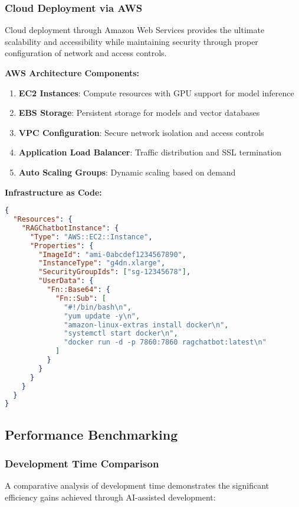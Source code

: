 \subsubsection{Cloud Deployment via AWS}

Cloud deployment through Amazon Web Services provides the ultimate scalability and accessibility while maintaining security through proper configuration of network and access controls.

\textbf{AWS Architecture Components:}
\begin{enumerate}
    \item \textbf{EC2 Instances}: Compute resources with GPU support for model inference
    \item \textbf{EBS Storage}: Persistent storage for models and vector databases
    \item \textbf{VPC Configuration}: Secure network isolation and access controls
    \item \textbf{Application Load Balancer}: Traffic distribution and SSL termination
    \item \textbf{Auto Scaling Groups}: Dynamic scaling based on demand
\end{enumerate}

\textbf{Infrastructure as Code:}
\begin{lstlisting}[language=json, caption=AWS CloudFormation Template Excerpt]
{
  "Resources": {
    "RAGChatbotInstance": {
      "Type": "AWS::EC2::Instance",
      "Properties": {
        "ImageId": "ami-0abcdef1234567890",
        "InstanceType": "g4dn.xlarge",
        "SecurityGroupIds": ["sg-12345678"],
        "UserData": {
          "Fn::Base64": {
            "Fn::Sub": [
              "#!/bin/bash\n",
              "yum update -y\n",
              "amazon-linux-extras install docker\n",
              "systemctl start docker\n",
              "docker run -d -p 7860:7860 ragchatbot:latest\n"
            ]
          }
        }
      }
    }
  }
}
\end{lstlisting}

\subsection{Performance Benchmarking}

\subsubsection{Development Time Comparison}

A comparative analysis of development time demonstrates the significant efficiency gains achieved through AI-assisted development:


